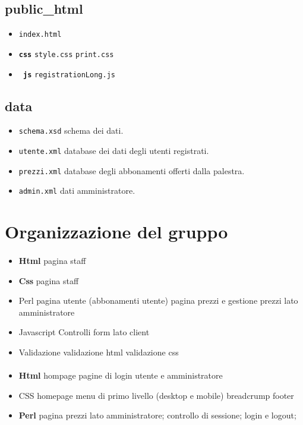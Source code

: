\documentclass[12pt,a4paper]{article}
\begin{document}
\subsection{public\_html}
\begin{itemize}
	\item \texttt{index.html } 
	\item \texttt{\textbf{css}}
		\subitem \texttt{style.css}
		\subitem \texttt{print.css}
	\item\texttt{\textbf{ js}}
	\subitem \texttt{registrationLong.js}
\end{itemize}
\subsection{data}
\begin{itemize}
	\item \texttt{schema.xsd} schema dei dati. 
	\item \texttt{utente.xml} database dei dati degli utenti registrati. 
	\item \texttt{prezzi.xml} database degli abbonamenti offerti dalla palestra. 
	\item \texttt{admin.xml} dati amministratore. 
\end{itemize}

\section{Organizzazione del gruppo}
\paragraph{\TF{}}
\begin{itemize}
	\item \textbf{Html}
	\subitem pagina staff
	\item \textbf{Css}
	\subitem pagina staff
	\item{Perl}
	\subitem pagina utente (abbonamenti utente)
	\subitem pagina prezzi e gestione prezzi lato amministratore
	\item Javascript
	\subitem Controlli form lato client
	\item Validazione
	\subitem validazione html
	\subitem validazione css
	
	
\end{itemize}
\paragraph{\LB{}}
\begin{itemize}
	\item \textbf{Html}
	\subitem hompage
	\subitem pagine di login utente e amministratore
	\item{CSS}
	\subitem homepage
	\subitem menu di primo livello (desktop e mobile)
	\subitem breadcrump
	\subitem footer
	\item \textbf{Perl}
	\subitem pagina prezzi lato amministratore;
	\subitem controllo di sessione;
	\subitem login e logout;
\end{itemize}
\end{document}
